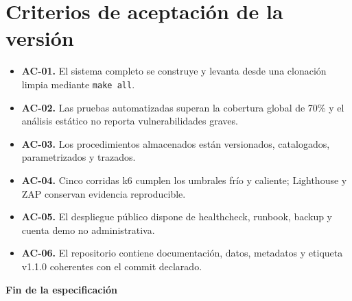 \documentclass[11pt,a4paper]{article}
\begin{document}
\newpage
\section{Criterios de aceptación de la versión}
\begin{itemize}[label=\textbf{--}]
    \item \textbf{AC-01.} El sistema completo se construye y levanta desde una clonación limpia mediante \texttt{make all}.
    \item \textbf{AC-02.} Las pruebas automatizadas superan la cobertura global de 70\% y el análisis estático no reporta vulnerabilidades graves.
    \item \textbf{AC-03.} Los procedimientos almacenados están versionados, catalogados, parametrizados y trazados.
    \item \textbf{AC-04.} Cinco corridas k6 cumplen los umbrales frío y caliente; Lighthouse y ZAP conservan evidencia reproducible.
    \item \textbf{AC-05.} El despliegue público dispone de healthcheck, runbook, backup y cuenta demo no administrativa.
    \item \textbf{AC-06.} El repositorio contiene documentación, datos, metadatos y etiqueta v1.1.0 coherentes con el commit declarado.
\end{itemize}

\vspace{1cm}
\noindent\textbf{\Large Fin de la especificación}
\end{document}
